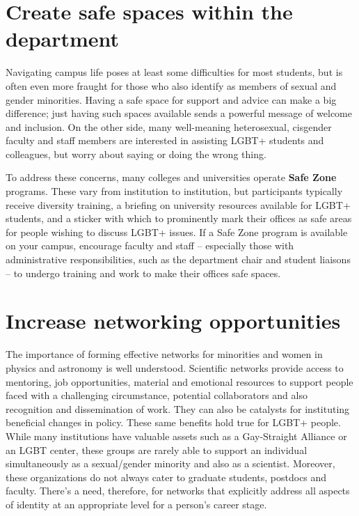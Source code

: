 \section {Create safe spaces within the department}
\label{safe-spaces}
Navigating campus life poses at least some difficulties for most students, but is often even more fraught for those who also identify as members of sexual and gender minorities. Having a safe space for support and advice can make a big difference; just having such spaces available sends a powerful message of welcome and inclusion. On the other side, many well-meaning heterosexual, cisgender faculty and staff members are interested in assisting LGBT+ students and colleagues, but worry about saying or doing the wrong thing.

To address these concerns, many colleges and universities operate \textbf{Safe Zone} programs. These vary from institution to institution, but participants typically receive diversity training, a briefing on university resources available for LGBT+ students, and a sticker with which to prominently mark their offices as safe areas for people wishing to discuss LGBT+ issues. If a Safe Zone program is available on your campus, encourage faculty and staff -- especially those with administrative responsibilities, such as the department chair and student liaisons -- to undergo training and work to make their offices safe spaces.


\section {Increase networking opportunities}
\label{networking}
The importance of forming effective networks for minorities and women in physics and astronomy is well understood. Scientific networks provide access to mentoring, job opportunities, material and emotional resources to support people faced with a challenging circumstance, potential collaborators and also recognition and dissemination of work. They can also be catalysts for instituting beneficial changes in policy. These same benefits hold true for LGBT+ people. While many institutions have valuable assets such as a Gay-Straight Alliance or an LGBT center, these groups are rarely able to support an individual simultaneously as a sexual/gender minority and also as a scientist. Moreover, these organizations do not always cater to graduate students, postdocs and faculty. There's a need, therefore, for networks that explicitly address all aspects of identity at an appropriate level for a person's career stage.

